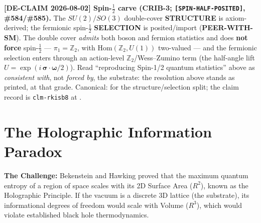 \noindent\textbf{[DE-CLAIM 2026-08-02] Spin-$\frac{1}{2}$ carve (CRIB-3; \texttt{[SPIN-HALF-POSITED]}, \#584/\#585).} The $SU(2)/SO(3)$ double-cover \textbf{STRUCTURE} is axiom-derived; the fermionic spin-$\frac{1}{2}$ \textbf{SELECTION} is posited/import (\textbf{PEER-WITH-SM}). The double cover \emph{admits} both boson and fermion statistics and does \textbf{not force} spin-$\frac{1}{2}$ --- $\pi_1 = \mathbb{Z}_2$, with $\mathrm{Hom}(\mathbb{Z}_2, U(1))$ two-valued --- and the fermionic selection enters through an action-level $\mathbb{Z}_2$/Wess--Zumino term (the half-angle lift $U = \exp(i\,\boldsymbol{\sigma}\cdot\boldsymbol{\omega}/2)$). Read ``reproducing Spin-1/2 quantum statistics'' above as \emph{consistent with}, not \emph{forced by}, the substrate: the resolution above stands as printed, at that grade. Canonical:  for the structure/selection split; the claim record is \texttt{clm-rkisb8} at .

\section{The Holographic Information Paradox}
\textbf{The Challenge:} Bekenstein and Hawking proved that the maximum quantum entropy of a region of space scales with its 2D Surface Area ($R^2$), known as the Holographic Principle. If the vacuum is a discrete 3D lattice (the substrate), its informational degrees of freedom would scale with Volume ($R^3$), which would violate established black hole thermodynamics.

